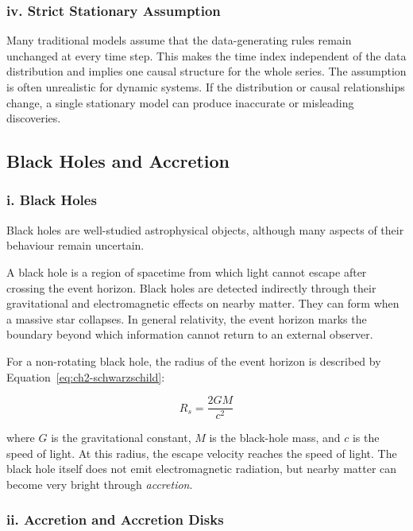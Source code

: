 \subsubsection*{iv. Strict Stationary Assumption}

Many traditional models assume that the data-generating rules remain unchanged at every time step. This makes the time index independent of the data distribution and implies one causal structure for the whole series. The assumption is often unrealistic for dynamic systems. If the distribution or causal relationships change, a single stationary model can produce inaccurate or misleading discoveries.

\subsection{Black Holes and Accretion}

\subsubsection*{i. Black Holes}

Black holes are well-studied astrophysical objects, although many aspects of their behaviour remain uncertain.

A black hole is a region of spacetime from which light cannot escape after crossing the event horizon. Black holes are detected indirectly through their gravitational and electromagnetic effects on nearby matter. They can form when a massive star collapses. In general relativity, the event horizon marks the boundary beyond which information cannot return to an external observer.

For a non-rotating black hole, the radius of the event horizon is described by Equation~\eqref{eq:ch2-schwarzschild}:

\begin{equation}
    \label{eq:ch2-schwarzschild}
    R_s = \frac{2GM}{c^2}
\end{equation}

where $G$ is the gravitational constant, $M$ is the black-hole mass, and $c$ is the speed of light. At this radius, the escape velocity reaches the speed of light. The black hole itself does not emit electromagnetic radiation, but nearby matter can become very bright through \textit{accretion}.

\subsubsection*{ii. Accretion and Accretion Disks}

